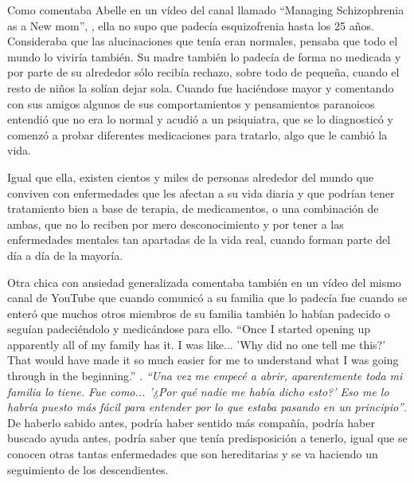 \documentclass[12pt, a4paper,twoside,titlepage]{book}
\begin{document}
Como comentaba Abelle en un vídeo del canal  llamado ``Managing Schizophrenia as a New mom'', \cite{videoEsquizofrenia}, ella no supo que padecía esquizofrenia hasta los 25 años. Consideraba que las alucinaciones que tenía eran normales, pensaba que todo el mundo lo viviría también. Su madre también lo padecía de forma no medicada y por parte de su alrededor sólo recibía rechazo, sobre todo de pequeña, cuando el resto de niños la solían dejar sola. Cuando fue haciéndose mayor y comentando con sus amigos algunos de sus comportamientos y pensamientos paranoicos entendió que no era lo normal y acudió a un psiquiatra, que se lo diagnosticó y comenzó a probar diferentes medicaciones para tratarlo, algo que le cambió la vida. 

Igual que ella, existen cientos y miles de personas alrededor del mundo que conviven con enfermedades que les afectan a su vida diaria y que podrían tener tratamiento bien a base de terapia, de medicamentos, o una combinación de ambas, que no lo reciben por mero desconocimiento y por tener a las enfermedades mentales tan apartadas de la vida real, cuando forman parte del día a día de la mayoría.

Otra chica con ansiedad generalizada comentaba también en un vídeo del mismo canal de YouTube que cuando comunicó a su familia que lo padecía fue cuando se enteró que muchos otros miembros de su familia también lo habían padecido o seguían padeciéndolo y medicándose para ello. ``Once I started opening up apparently all of my family has it. I was like... 'Why did no one tell me this?' That would have made it so much easier for me to understand what I was going through in the beginning.'' \cite{videoTAG}. \textit{``Una vez me empecé a abrir, aparentemente toda mi familia lo tiene. Fue como... '¿Por qué nadie me había dicho esto?' Eso me lo habría puesto más fácil para entender por lo que estaba pasando en un principio''}. De haberlo sabido antes, podría haber sentido más compañía, podría haber buscado ayuda antes, podría saber que tenía predisposición a tenerlo, igual que se conocen otras tantas enfermedades que son hereditarias y se va haciendo un seguimiento de los descendientes.
\end{document}
